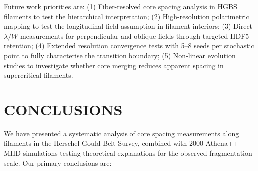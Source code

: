 \documentclass[twoside,twocolumn]{mnras}
\begin{document}
Future work priorities are: (1) Fiber-resolved core spacing analysis in HGBS filaments to test the hierarchical interpretation; (2) High-resolution polarimetric mapping to test the longitudinal-field assumption in filament interiors; (3) Direct $\lambda/W$ measurements for perpendicular and oblique fields through targeted HDF5 retention; (4) Extended resolution convergence tests with 5--8 seeds per stochastic point to fully characterise the transition boundary; (5) Non-linear evolution studies to investigate whether core merging reduces apparent spacing in supercritical filaments.

\section{CONCLUSIONS}

We have presented a systematic analysis of core spacing measurements along filaments in the Herschel Gould Belt Survey, combined with 2000 Athena++ MHD simulations testing theoretical explanations for the observed fragmentation scale. Our primary conclusions are:
\end{document}
